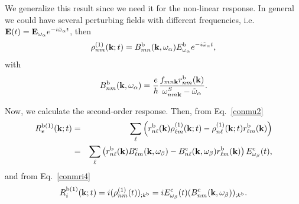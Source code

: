 \documentclass[floatfix,prb,aps,superscriptaddress,11pt,preprint]{revtex4}
\begin{document}
We generalize this result since we need it for the non-linear response.
In general we could have several perturbing fields with different
frequencies,
i.e. $\mathbf{E}(t)=\mathbf{E}_{\omega_\alpha} e^{-i\tilde\omega_\alpha t}$, then
\begin{equation}\label{rhonoi1}
\rho^{(1)}_{nm}(\mathbf{k};t)=B^{\mathrm{b}}_{mn}(\mathbf{k},\omega_\alpha)E_{\omega_\alpha}^{\mathrm{b}}e^{-i\tilde\omega_\alpha t}
,
\end{equation}
with
\begin{equation}\label{rho1} 
B^{\mathrm{b}}_{nm}(\mathbf{k},\omega_\alpha)=\frac{e}{\hbar}\frac{f_{mn\mathbf{k}}r^{\mathrm{b}}_{nm}(\mathbf{k})}{\omega^S_{nm\mathbf{k}}-\tilde\omega_\alpha}
.
\end{equation} 

Now, we calculate the second-order response. Then, from Eq.~\eqref{conmu2}
\begin{eqnarray}\label{R1e}
R_e^{\mathrm{b}(1)}(\mathbf{k};t)
&=&
\sum_{\ell}
\left(
r^{\mathrm{b}}_{n\ell}(\mathbf{k})
{\rho}^{(1)}_{\ell m}(\mathbf{k};t)
-
{\rho}^{(1)}_{n\ell}(\mathbf{k};t)
r^{\mathrm{b}}_{\ell m}(\mathbf{k})
\right)
\nonumber \\
&=&
\sum_{\ell}
\left(
r^{\mathrm{b}}_{n\ell}(\mathbf{k})
B^{\mathrm{c}}_{\ell m}(\mathbf{k},\omega_\beta)
-
B^{\mathrm{c}}_{n\ell}(\mathbf{k},\omega_\beta)
r^{\mathrm{b}}_{\ell m}(\mathbf{k})
\right)E_{\omega_\beta}^{\mathrm{c}}(t)
,
\end{eqnarray}
and from Eq.~\eqref{conmri4}
\begin{equation}\label{R1i}
R_i^{\mathrm{b}(1)}(\mathbf{k};t)=i(\rho^{(1)}_{nm}(t))_{;k^{\mathrm{b}}}=iE_{\omega_\beta}^{\mathrm{c}}(t)(B^{\mathrm{c}}_{nm}(\mathbf{k},\omega_\beta))_{;k^{\mathrm{b}}}
.
\end{equation}
\end{document}
